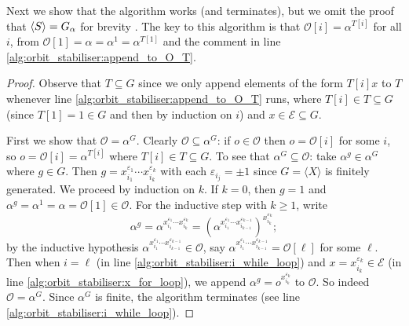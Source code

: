 
Next we show that the algorithm works (and terminates), but we omit the proof that $\langle S \rangle = \added{2}{G_\alpha}$ for brevity . The key to this algorithm is that $\mathcal{O}[i] = \alpha^{T[i]}$ for all $i$, from $\mathcal{O}[1] = \alpha = \alpha^1 = \alpha^{T[1]}$ and the comment in line \ref{alg:orbit_stabiliser:append_to_O_T}.

\begin{proof}
    Observe that $T \subseteq G$ since we only append elements of the form $T[i]x$ to $T$ whenever line \ref{alg:orbit_stabiliser:append_to_O_T} runs, where $T[i] \in T \subseteq G$ (since $T[1] = 1 \in G$ and then by induction on $i$) and $x \in \mathcal{E} \subseteq G$.

    First we show that $\mathcal{O} = \alpha^G$. Clearly $\mathcal{O} \subseteq \alpha^G$: if $o \in \mathcal{O}$ then $o = \mathcal{O}[i]$ for some $i$, so $o = \mathcal{O}[i] = \alpha^{T[i]}$ where $T[i] \in T \subseteq G$. To see that $\alpha^G \subseteq \mathcal{O}$: take $\alpha^g \in \alpha^G$ where $g \in G$. Then $g = x_{i_1}^{\varepsilon_1}\dotsb x_{i_k}^{\varepsilon_k}$ with each $\varepsilon_{i_j} = \pm 1$ since $G = \langle X \rangle$ is finitely generated. We proceed by induction on $k$. If $k = 0$, then $g = 1$ and $\alpha^g = \alpha^1 = \alpha = \mathcal{O}[1] \in \mathcal{O}$. For the inductive step with $k \geq 1$, write
    $$\alpha^g = \alpha^{x_{i_1}^{\varepsilon_1}\dotsb x_{i_k}^{\varepsilon_k}} = \left(\alpha^{x_{i_1}^{\varepsilon_1}\dotsb x_{i_{k - 1}}^{\varepsilon_{k - 1}}}\right)^{x_{i_k}^{\varepsilon_k}};$$
    by the inductive hypothesis $\alpha^{x_{i_1}^{\varepsilon_1}\dotsb x_{i_{k - 1}}^{\varepsilon_{k - 1}}} \in \mathcal{O}$, say $\alpha^{x_{i_1}^{\varepsilon_1}\dotsb x_{i_{k - 1}}^{\varepsilon_{k - 1}}} = \mathcal{O}[\ell]$ for some $\ell$. Then when $i = \ell$ (in line \ref{alg:orbit_stabiliser:i_while_loop}) and $x = x_{i_k}^{\varepsilon_k} \in \mathcal{E}$ (in line \ref{alg:orbit_stabiliser:x_for_loop}), we append $\alpha^g = o^{x_{i_k}^{\varepsilon_k}}$ to $\mathcal{O}$. So indeed $\mathcal{O} = \alpha^G$. Since $\alpha^G$ is finite, the algorithm terminates (see line \ref{alg:orbit_stabiliser:i_while_loop}).

\end{proof}

